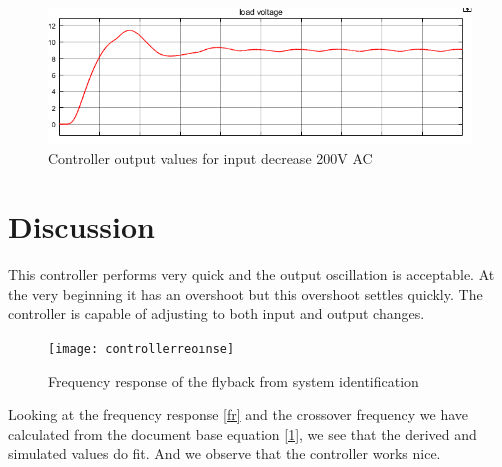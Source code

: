 \documentclass[12pt]{article}
\begin{document}
\begin{figure}[H]
    \centering
    \includegraphics[width=14cm]{d4}
    \caption{Controller output values for input decrease 200V AC}
    \label{fig:d2}
\end{figure}

\section{Discussion}

This controller performs very quick and the output oscillation is acceptable. At the very beginning it has an overshoot but this overshoot settles quickly. The controller is capable of adjusting to both input and output changes. 

\begin{figure}
    \centering
    \texttt{[image: controllerreoınse]}
    \caption{Frequency response of the flyback from system identification}
    \label{fig:fr}
\end{figure}

Looking at the frequency response \ref{fr} and the crossover frequency we have calculated from the document base equation \ref{1}, we see that the derived and simulated values do fit. And we observe that the controller works nice.
\end{document}
